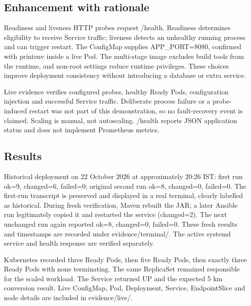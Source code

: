 \documentclass[12pt,a4paper]{article}
\begin{document}
\subsection*{Enhancement with rationale}
Readiness and liveness HTTP probes request /health. Readiness determines eligibility to receive Service traffic; liveness detects an unhealthy running process and can trigger restart. The ConfigMap supplies APP\_PORT=8080, confirmed with printenv inside a live Pod. The multi-stage image excludes build tools from the runtime, and non-root settings reduce runtime privileges. These choices improve deployment consistency without introducing a database or extra service.

Live evidence verifies configured probes, healthy Ready Pods, configuration injection and successful Service traffic. Deliberate process failure or a probe-induced restart was not part of this demonstration, so no fault-recovery event is claimed. Scaling is manual, not autoscaling. /health reports JSON application status and does not implement Prometheus metrics.

\subsection*{Results}
Historical deployment on 22 October 2026 at approximately 20:26 IST: first run ok=9, changed=6, failed=0; original second run ok=8, changed=0, failed=0. The first-run transcript is preserved and displayed in a real terminal, clearly labelled as historical. During fresh verification, Maven rebuilt the JAR; a later Ansible run legitimately copied it and restarted the service (changed=2). The next unchanged run again reported ok=8, changed=0, failed=0. These fresh results and timestamps are recorded under evidence/terminal/. The active systemd service and health response are verified separately.

Kubernetes recorded three Ready Pods, then five Ready Pods, then exactly three Ready Pods with none terminating. The same ReplicaSet remained responsible for the scaled workload. The Service returned UP and the expected 5 km conversion result. Live ConfigMap, Pod, Deployment, Service, EndpointSlice and node details are included in evidence/live/.
\end{document}
